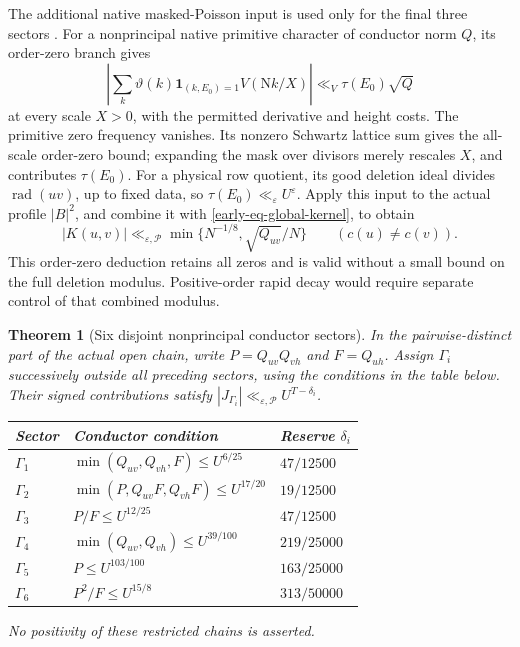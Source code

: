 \documentclass[11pt]{article}
\newtheorem{theorem}{Theorem}[section]
\theoremstyle{definition}
\newcommand{\N}{\mathrm N}
\newcommand{\eps}{\varepsilon}
\newcommand{\lls}{\ll_{\eps,\mathcal P}}
\begin{document}
The additional native masked-Poisson input is used only for the final
three sectors \cite{n4,n5,sf}.  For a nonprincipal native primitive
character of conductor norm \(Q\), its order-zero branch gives
\[
 \left|\sum_k\vartheta(k)\mathbf1_{(k,E_0)=1}
                         V(\N k/X)\right|
       \ll_V\tau(E_0)\sqrt Q
\]
at every scale \(X>0\), with the permitted derivative and height
costs.  The primitive zero frequency vanishes.  Its nonzero Schwartz
lattice sum gives the all-scale order-zero bound; expanding the mask
over divisors merely rescales \(X\), and contributes \(\tau(E_0)\).
For a physical row quotient, its good deletion ideal divides
\(\operatorname{rad}(uv)\), up to fixed data, so
\(\tau(E_0)\ll_\eps U^\eps\).  Apply this input to the actual profile
\(|B|^2\), and combine it with
\eqref{early-eq-global-kernel}, to obtain
\begin{equation}\label{early-eq-completed-kernel}
 |K(u,v)|\lls
       \min\{N^{-1/8},\sqrt{Q_{uv}}/N\}
                  \qquad(c(u)\ne c(v)).
\end{equation}
This order-zero deduction retains all zeros and is valid without a
small bound on the full deletion modulus.  Positive-order rapid
decay would require separate control of that combined modulus.

\begin{theorem}[Six disjoint nonprincipal conductor sectors]
\label{early-thm-six}
In the pairwise-distinct part of the actual open chain, write
\(P=Q_{uv}Q_{vh}\) and \(F=Q_{uh}\).
Assign \(\Gamma_i\) successively outside all preceding sectors,
using the conditions in the table below.  Their signed contributions
satisfy \(|J_{\Gamma_i}|\lls U^{T-\delta_i}\).
\begin{center}
\begin{tabular}{lll}
\hline
Sector & Conductor condition & Reserve \(\delta_i\)\\
\hline
\(\Gamma_1\) & \(\min(Q_{uv},Q_{vh},F)\le U^{6/25}\)
             & \(47/12500\)\\
\(\Gamma_2\) & \(\min(P,Q_{uv}F,Q_{vh}F)\le U^{17/20}\)
             & \(19/12500\)\\
\(\Gamma_3\) & \(P/F\le U^{12/25}\)
             & \(47/12500\)\\
\(\Gamma_4\) & \(\min(Q_{uv},Q_{vh})\le U^{39/100}\)
             & \(219/25000\)\\
\(\Gamma_5\) & \(P\le U^{103/100}\)
             & \(163/25000\)\\
\(\Gamma_6\) & \(P^2/F\le U^{15/8}\)
             & \(313/50000\)\\
\hline
\end{tabular}
\end{center}
No positivity of these restricted chains is asserted.
\end{theorem}
\end{document}

